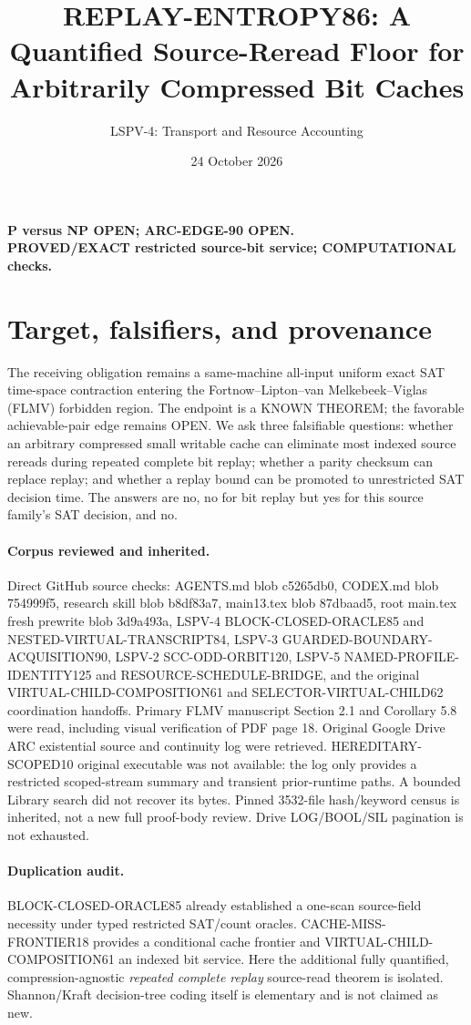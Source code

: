 \documentclass[11pt]{article}
\title{REPLAY-ENTROPY86: A Quantified Source-Reread Floor for Arbitrarily Compressed Bit Caches}
\author{LSPV-4: Transport and Resource Accounting}
\date{24 October 2026}
\begin{document}
\maketitle
\begin{center}\textbf{P versus NP OPEN; ARC-EDGE-90 OPEN.}\\
\textbf{PROVED/EXACT restricted source-bit service; COMPUTATIONAL checks.}\end{center}
\section{Target, falsifiers, and provenance}
The receiving obligation remains a same-machine all-input uniform exact SAT time-space contraction entering the Fortnow--Lipton--van Melkebeek--Viglas (FLMV) forbidden region. The endpoint is a KNOWN THEOREM; the favorable achievable-pair edge remains OPEN. We ask three falsifiable questions: whether an arbitrary compressed small writable cache can eliminate most indexed source rereads during repeated complete bit replay; whether a parity checksum can replace replay; and whether a replay bound can be promoted to unrestricted SAT decision time. The answers are no, no for bit replay but yes for this source family's SAT decision, and no.
\paragraph{Corpus reviewed and inherited.}
Direct GitHub source checks: AGENTS.md blob c5265db0, CODEX.md blob 754999f5, research skill blob b8df83a7, main13.tex blob 87dbaad5, root main.tex fresh prewrite blob 3d9a493a, LSPV-4 BLOCK-CLOSED-ORACLE85 and NESTED-VIRTUAL-TRANSCRIPT84, LSPV-3 GUARDED-BOUNDARY-ACQUISITION90, LSPV-2 SCC-ODD-ORBIT120, LSPV-5 NAMED-PROFILE-IDENTITY125 and RESOURCE-SCHEDULE-BRIDGE, and the original VIRTUAL-CHILD-COMPOSITION61 and SELECTOR-VIRTUAL-CHILD62 coordination handoffs. Primary FLMV manuscript Section 2.1 and Corollary 5.8 were read, including visual verification of PDF page 18. Original Google Drive ARC existential source and continuity log were retrieved. HEREDITARY-SCOPED10 original executable was not available: the log only provides a restricted scoped-stream summary and transient prior-runtime paths. A bounded Library search did not recover its bytes. Pinned 3532-file hash/keyword census is inherited, not a new full proof-body review. Drive LOG/BOOL/SIL pagination is not exhausted.
\paragraph{Duplication audit.}
BLOCK-CLOSED-ORACLE85 already established a one-scan source-field necessity under typed restricted SAT/count oracles. CACHE-MISS-FRONTIER18 provides a conditional cache frontier and VIRTUAL-CHILD-COMPOSITION61 an indexed bit service. Here the additional fully quantified, compression-agnostic \emph{repeated complete replay} source-read theorem is isolated. Shannon/Kraft decision-tree coding itself is elementary and is not claimed as new.
\end{document}
